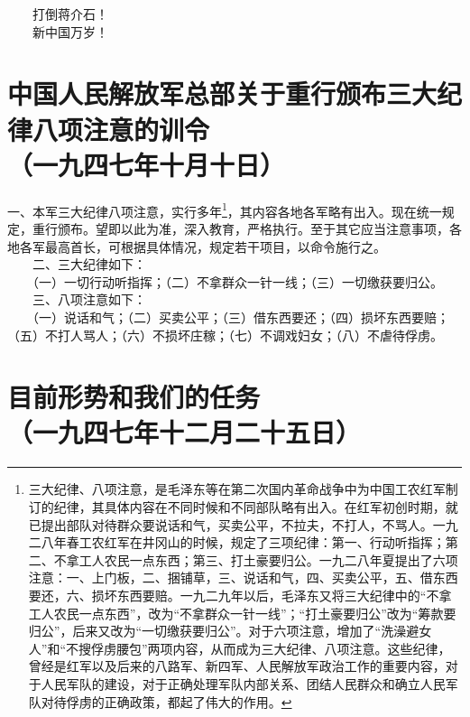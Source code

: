\documentclass[cn,11pt,chinese]{elegantbook}
\def\myformat#1{\hfil\hfil #1}
\begin{document}
　　打倒蒋介石！\\
　　新中国万岁！\\
\newpage\section*{\myformat{中国人民解放军总部关于重行颁布三大纪律八项注意的训令}\\\myformat{（一九四七年十月十日）}}
一、本军三大纪律八项注意，实行多年\footnote[1]{ 三大纪律、八项注意，是毛泽东等在第二次国内革命战争中为中国工农红军制订的纪律，其具体内容在不同时候和不同部队略有出入。在红军初创时期，就已提出部队对待群众要说话和气，买卖公平，不拉夫，不打人，不骂人。一九二八年春工农红军在井冈山的时候，规定了三项纪律：第一、行动听指挥；第二、不拿工人农民一点东西；第三、打土豪要归公。一九二八年夏提出了六项注意：一、上门板，二、捆铺草，三、说话和气，四、买卖公平，五、借东西要还，六、损坏东西要赔。一九二九年以后，毛泽东又将三大纪律中的“不拿工人农民一点东西”，改为“不拿群众一针一线”；“打土豪要归公”改为“筹款要归公”，后来又改为“一切缴获要归公”。对于六项注意，增加了“洗澡避女人”和“不搜俘虏腰包”两项内容，从而成为三大纪律、八项注意。这些纪律，曾经是红军以及后来的八路军、新四军、人民解放军政治工作的重要内容，对于人民军队的建设，对于正确处理军队内部关系、团结人民群众和确立人民军队对待俘虏的正确政策，都起了伟大的作用。}，其内容各地各军略有出入。现在统一规定，重行颁布。望即以此为准，深入教育，严格执行。至于其它应当注意事项，各地各军最高首长，可根据具体情况，规定若干项目，以命令施行之。\\
　　二、三大纪律如下：\\
　　（一）一切行动听指挥；（二）不拿群众一针一线；（三）一切缴获要归公。\\
　　三、八项注意如下：\\
　　（一）说话和气；（二）买卖公平；（三）借东西要还；（四）损坏东西要赔；（五）不打人骂人；（六）不损坏庄稼；（七）不调戏妇女；（八）不虐待俘虏。\\
\newpage\section*{\myformat{目前形势和我们的任务}\\\myformat{（一九四七年十二月二十五日）}}
\end{document}
